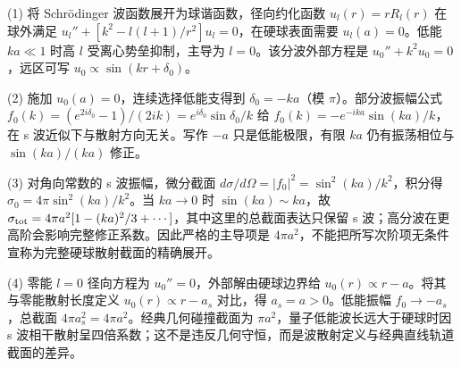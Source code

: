 (1) 将 Schrödinger 波函数展开为球谐函数，径向约化函数 \(u_l(r)=rR_l(r)\) 在球外满足 \(u_l''+[k^2-l(l+1)/r^2]u_l=0\)，在硬球表面需要 \(u_l(a)=0\)。低能 \(ka\ll1\) 时高 \(l\) 受离心势垒抑制，主导为 \(l=0\)。该分波外部方程是 \(u_0''+k^2u_0=0\)，远区可写 \(u_0\propto\sin(kr+\delta_0)\)。

(2) 施加 \(u_0(a)=0\)，连续选择低能支得到 \(\delta_0=-ka\)（模 \(\pi\)）。部分波振幅公式 \(f_0(k)=(e^{2i\delta_0}-1)/(2ik)=e^{i\delta_0}\sin\delta_0/k\) 给 \(f_0(k)=-e^{-ika}\sin(ka)/k\)，在 s 波近似下与散射方向无关。写作 \(-a\) 只是低能极限，有限 \(ka\) 仍有振荡相位与 \(\sin(ka)/(ka)\) 修正。

(3) 对角向常数的 s 波振幅，微分截面 \(d\sigma/d\Omega=|f_0|^2=\sin^2(ka)/k^2\)，积分得 \(\sigma_{0}=4\pi\sin^2(ka)/k^2\)。当 \(ka\to0\) 时 \(\sin(ka)\sim ka\)，故 \(\sigma_{\rm tot}=4\pi a^2[1-(ka)^2/3+\cdots]\)，其中这里的总截面表达只保留 s 波；高分波在更高阶会影响完整修正系数。因此严格的主导项是 \(4\pi a^2\)，不能把所写次阶项无条件宣称为完整硬球散射截面的精确展开。

(4) 零能 \(l=0\) 径向方程为 \(u_0''=0\)，外部解由硬球边界给 \(u_0(r)\propto r-a\)。将其与零能散射长度定义 \(u_0(r)\propto r-a_s\) 对比，得 \(a_s=a>0\)。低能振幅 \(f_0\to-a_s\)，总截面 \(4\pi a_s^2=4\pi a^2\)。经典几何碰撞截面为 \(\pi a^2\)，量子低能波长远大于硬球时因 s 波相干散射呈四倍系数；这不是违反几何守恒，而是波散射定义与经典直线轨道截面的差异。
